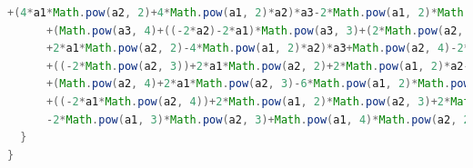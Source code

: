 \documentclass{article}
\begin{document}
{\begin{lstlisting}[language = Java,breaklines = true]
      +(4*a1*Math.pow(a2, 2)+4*Math.pow(a1, 2)*a2)*a3-2*Math.pow(a1, 2)*Math.pow(a2, 2))*b1)*b2+(Math.pow(a3, 2)-2*a2*a3+Math.pow(a2, 2))*Math.pow(b1, 4)
      +(Math.pow(a3, 4)+((-2*a2)-2*a1)*Math.pow(a3, 3)+(2*Math.pow(a2, 2)+2*a1*a2+2*Math.pow(a1, 2))*Math.pow(a3, 2)+((-2*Math.pow(a2, 3))
      +2*a1*Math.pow(a2, 2)-4*Math.pow(a1, 2)*a2)*a3+Math.pow(a2, 4)-2*a1*Math.pow(a2, 3)+2*Math.pow(a1, 2)*Math.pow(a2, 2))*Math.pow(b1, 2)+(Math.pow(a2, 2)-2*a1*a2+Math.pow(a1, 2))*Math.pow(a3, 4)
      +((-2*Math.pow(a2, 3))+2*a1*Math.pow(a2, 2)+2*Math.pow(a1, 2)*a2-2*Math.pow(a1, 3))*Math.pow(a3, 3)
      +(Math.pow(a2, 4)+2*a1*Math.pow(a2, 3)-6*Math.pow(a1, 2)*Math.pow(a2, 2)+2*Math.pow(a1, 3)*a2+Math.pow(a1, 4))*Math.pow(a3, 2)
      +((-2*a1*Math.pow(a2, 4))+2*Math.pow(a1, 2)*Math.pow(a2, 3)+2*Math.pow(a1, 3)*Math.pow(a2, 2)-2*Math.pow(a1, 4)*a2)*a3+Math.pow(a1, 2)*Math.pow(a2, 4)
      -2*Math.pow(a1, 3)*Math.pow(a2, 3)+Math.pow(a1, 4)*Math.pow(a2, 2))/((2*a2-2*a1)*b3+(2*a1-2*a3)*b2+(2*a3-2*a2)*b1);
  } 
}
\end{lstlisting}
}


\end{document}
